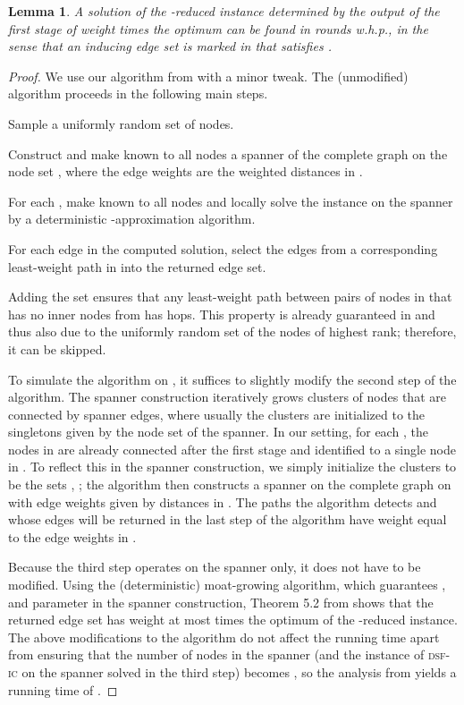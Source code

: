 \documentclass[letterpaper,11pt]{article}
\newtheorem{lemma}[theorem]{Lemma}
\newcommand{\sfic}{\textsc{dsf-ic}\xspace}
\begin{document}
\begin{lemma}\label{lemma:stage2_solve}
A solution  of the -reduced instance determined by the output of the
first stage of weight  times the optimum can be found in
 rounds w.h.p., in the sense that an inducing edge set
 is marked in  that satisfies .
\end{lemma}
\begin{proof}
We use our algorithm from \cite{LenzenP13} with a minor tweak. The (unmodified)
algorithm proceeds in the following main steps.
\begin{compactitem}
\item Sample a uniformly random set  of
 nodes.
\item Construct and make known to all nodes a spanner of the complete graph on
the node set , where the edge weights are the weighted distances
in .
\item For each , make  known to all nodes and locally solve
the instance on the spanner by a deterministic -approximation algorithm.
\item For each edge in the computed solution, select the edges from a
corresponding least-weight path in  into the returned edge set.
\end{compactitem}
Adding the set  ensures that any least-weight path between pairs of
nodes in  that has no inner nodes from  has
 hops. This property is already guaranteed in  and
thus also  due to the uniformly random set  of the 
nodes of highest rank; therefore, it can be skipped.

To simulate the algorithm on , it suffices to slightly modify the
second step of the algorithm. The spanner construction iteratively grows
clusters of nodes that are connected by spanner edges, where usually the
clusters are initialized to the singletons given by the node set of the spanner.
In our setting, for each , the nodes in  are already
connected after the first stage and identified to a single node in .
To reflect this in the spanner construction, we simply initialize the clusters
to be the sets , ; the algorithm then constructs a spanner
on the complete graph on  with edge weights given by
distances in . The paths the algorithm detects and whose edges will be
returned in the last step of the algorithm have weight equal to the edge weights
in .

Because the third step operates on the spanner only, it does not have to be
modified. Using the (deterministic) moat-growing algorithm, which guarantees
, and parameter  in the spanner construction, Theorem 5.2
from \cite{LenzenP13} shows that the returned edge set  has weight at most
 times the optimum of the -reduced instance. The above
modifications to the algorithm do not affect the running time apart from
ensuring that the number of nodes in the spanner (and the instance of \sfic on
the spanner solved in the third step) becomes , so the analysis from
\cite{LenzenP13} yields a running time of .
\end{proof}
\end{document}
